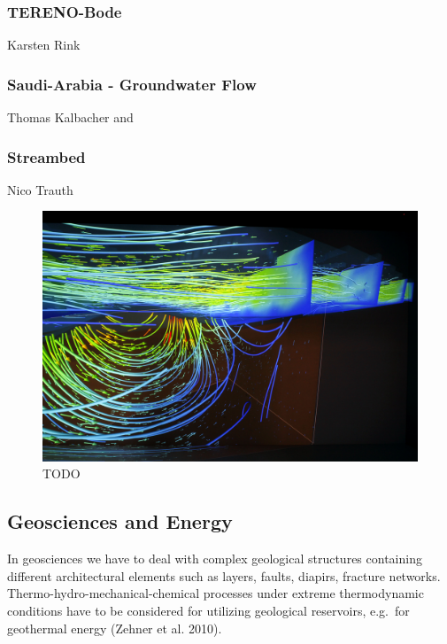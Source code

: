 \subsubsection{TERENO-Bode}\label{tereno-bode}

Karsten Rink

\subsubsection{Saudi-Arabia - Groundwater
Flow}\label{saudi-arabia---groundwater-flow}

Thomas Kalbacher \cite{zehner:modelcare} and \cite{rink:modelcare}

\subsubsection{Streambed}\label{streambed}

Nico Trauth

\begin{figure}
  \includegraphics[width=\linewidth]{images/streambed.jpg}
\caption{TODO}
\label{fig:streambed}
\end{figure}

\subsection{Geosciences and Energy}\label{geosciences-and-energy}

In geosciences we have to deal with complex geological structures containing different architectural elements such as layers, faults, diapirs, fracture networks. Thermo-hydro-mechanical-chemical processes under extreme thermodynamic conditions have to be considered for utilizing geological reservoirs, e.g.~for geothermal energy (Zehner et al. 2010).


